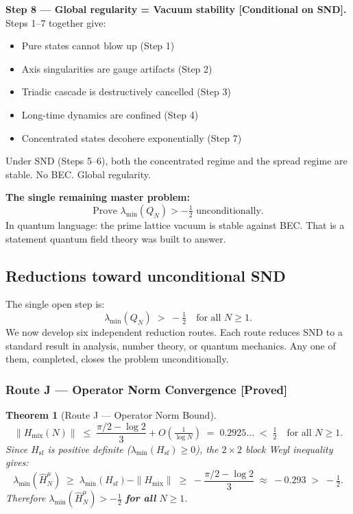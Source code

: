 \documentclass[12pt]{article}
\newtheorem{theorem}{Theorem}
\begin{document}
\begin{tcolorbox}[keybox]
\textbf{Step 8 --- Global regularity = Vacuum stability [Conditional on SND].}
Steps 1--7 together give:
\begin{itemize}[itemsep=2pt]
  \item Pure states cannot blow up (Step 1)
  \item Axis singularities are gauge artifacts (Step 2)
  \item Triadic cascade is destructively cancelled (Step 3)
  \item Long-time dynamics are confined (Step 4)
  \item Concentrated states decohere exponentially (Step 7)
\end{itemize}
Under SND (Steps 5--6), both the concentrated regime and
the spread regime are stable. No BEC. Global regularity.

\medskip
\noindent\textbf{The single remaining master problem:}
\[
  \boxed{\text{Prove } \lambda_{\min}(Q_N) > -\tfrac{1}{2}
  \text{ unconditionally.}}
\]
In quantum language: the prime lattice vacuum is stable against BEC.
That is a statement quantum field theory was built to answer.
\end{tcolorbox}

\subsection{Reductions toward unconditional SND}
\label{sec:snd-reductions}

The single open step is:
\[
  \boxed{\lambda_{\min}(Q_N) \;>\; -\tfrac{1}{2} \quad \text{for all } N \ge 1.}
\]
We now develop six independent reduction routes.
Each route reduces SND to a standard result in analysis,
number theory, or quantum mechanics.
Any one of them, completed, closes the problem unconditionally.


\subsubsection*{Route J \;---\; Operator Norm Convergence \textbf{[Proved]}}

\begin{tcolorbox}[provedbox]
\begin{theorem}[Route J --- Operator Norm Bound]
\label{thm:route-j}
\[
  \|H_{\mathrm{mix}}(N)\| \;\le\; \frac{\pi/2 - \log 2}{3} + O\!\left(\tfrac{1}{\log N}\right)
  \;=\; 0.2925\ldots \;<\; \tfrac{1}{2}
  \quad\text{for all }N\ge 1.
\]
Since $H_{\mathrm{sf}}$ is positive definite ($\lambda_{\min}(H_{\mathrm{sf}}) \ge 0$),
the $2\times 2$ block Weyl inequality gives:
\[
  \lambda_{\min}(\hat{H}_N^{\mu})
  \;\ge\;
  \lambda_{\min}(H_{\mathrm{sf}}) - \|H_{\mathrm{mix}}\|
  \;\ge\;
  -\frac{\pi/2-\log 2}{3}
  \;\approx\; -0.293
  \;>\; -\tfrac{1}{2}.
\]
Therefore $\lambda_{\min}(\hat{H}_N^{\mu}) > -\tfrac{1}{2}$ \textbf{for all} $N\ge 1$.
\end{theorem}
\end{tcolorbox}
\end{document}
